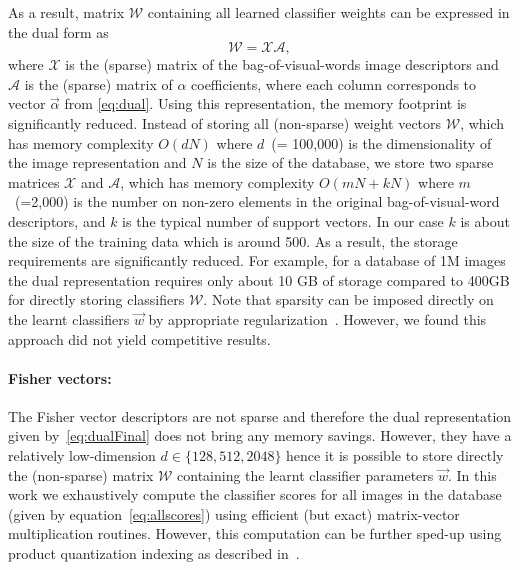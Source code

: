    
    As a result, matrix $\mathcal{W}$ containing all learned classifier weights can be expressed in the dual form as
      \begin{equation}
        \label{eq:dualFinal}
        \mathcal{W} = \mathcal{X} \mathcal{A},  
      \end{equation}
    \noindent
    where $\mathcal{X}$ is the (sparse) matrix of the bag-of-visual-words image descriptors and $\mathcal{A}$ is the (sparse) matrix of $\alpha$ coefficients, 
    where each column corresponds to vector $\vec{\alpha}$ from \eqref{eq:dual}. Using this representation, the memory footprint is significantly reduced. Instead of storing all (non-sparse) weight vectors $\mathcal{W}$, which has memory complexity $O(dN)$ where $d$~(= 100,000) is the dimensionality of the image representation and $N$ is the size of the database, we store two sparse matrices $\mathcal{X}$ and $\mathcal{A}$, which has memory complexity $O(mN+kN)$ where $m$~(=2,000) is the number on non-zero elements in the original bag-of-visual-word descriptors, and $k$ is the typical number of support vectors. In our case $k$ is about the size of the training data which is around 500. As a result, the storage requirements are significantly reduced. For example, for a database of 1M images the dual representation requires only about 10 GB of storage compared to 400GB for directly storing classifiers $\mathcal{W}$.  
    Note that sparsity can be imposed directly on the learnt classifiers $\vec{w}$ by appropriate regularization~\cite{scholkopf2002learning}. However, we found this approach did not yield competitive results.


  \paragraph{Fisher vectors:}    
    The Fisher vector descriptors are not sparse and therefore the dual representation given by~\eqref{eq:dualFinal} does not bring any memory savings.
    However, they have a relatively low-dimension $d\in\{128, 512, 2048\}$ hence it is possible to store directly the (non-sparse) matrix $\mathcal{W}$ containing the learnt classifier parameters $\vec{w}$. In this work we exhaustively compute the classifier scores for all images in the database (given by equation~\eqref{eq:allscores}) using efficient (but exact) matrix-vector multiplication routines. However, this computation can be further sped-up using product quantization indexing as described in~\cite{Jegou12}.     




